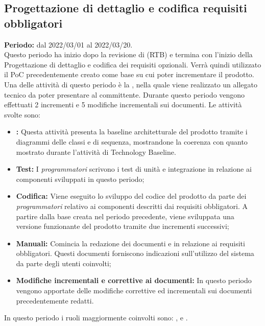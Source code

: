
 \subsection{Progettazione di dettaglio e codifica requisiti obbligatori} \label{subsection:pianificazione_requisiti_obbligatori}
\textbf{Periodo:} dal 2022/03/01 al 2022/03/20.
\bigskip
\\Questo periodo ha inizio dopo la revisione di \RTB{} (RTB) e termina con l'inizio della Progettazione di dettaglio e codifica dei requisiti opzionali.
Verrà quindi utilizzato il PoC precedentemente creato come base su cui poter incrementare il prodotto.
Una delle attività di questo periodo è la \PB{}, nella quale viene realizzato un allegato tecnico da poter presentare al committente.
Durante questo periodo vengono effettuati 2 incrementi e 5 modifiche incrementali sui documenti.
Le attività svolte sono:
\begin{itemize}
  \item \textbf{\PB{}:} Questa attività presenta la baseline architetturale del prodotto tramite i diagrammi delle classi e di sequenza, mostrandone la coerenza con quanto mostrato durante l'attività di Technology Baseline.
  \item \textbf{Test:} I \textit{programmatori} scrivono i test di unità e integrazione in relazione ai componenti sviluppati in questo periodo;
  \item \textbf{Codifica:} Viene eseguito lo sviluppo del codice del prodotto da parte dei \textit{programmatori} relativo ai componenti descritti dai requisiti obbligatori.
  A partire dalla base creata nel periodo precedente, viene sviluppata una versione funzionante del prodotto tramite due incrementi successivi;
  \item \textbf{Manuali:} Comincia la redazione dei documenti \docNameVersionMU{} e \docNameVersionMS{} in relazione ai requisiti obbligatori.
  Questi documenti forniscono indicazioni sull'utilizzo del sistema da parte degli utenti coinvolti;
  \item \textbf{Modifiche incrementali e correttive ai documenti:} In questo periodo vengono apportate delle modifiche correttive ed incrementali sui documenti precedentemente redatti.
\end{itemize}
In questo periodo i ruoli maggiormente coinvolti sono: \roleDesignerLow{}, \roleProgrammerLow{} e \roleVerifierLow{}.
\bigskip
